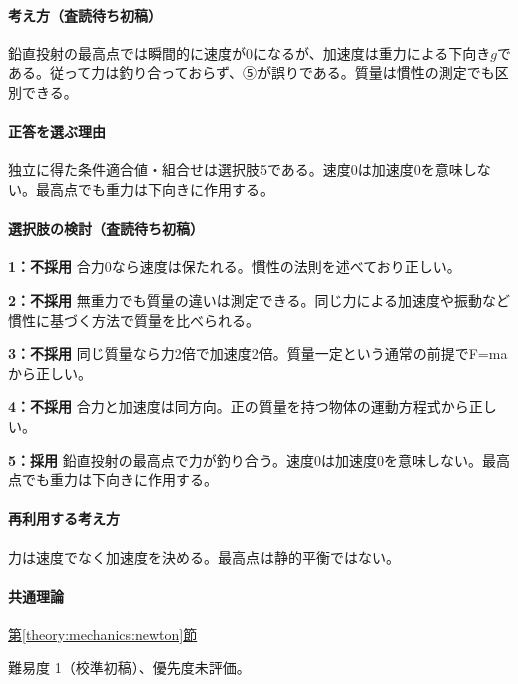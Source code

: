\paragraph{考え方（査読待ち初稿）} 鉛直投射の最高点では瞬間的に速度が0になるが、加速度は重力による下向き\(g\)である。従って力は釣り合っておらず、⑤が誤りである。質量は慣性の測定でも区別できる。

\paragraph{正答を選ぶ理由} 独立に得た条件適合値・組合せは選択肢5である。速度0は加速度0を意味しない。最高点でも重力は下向きに作用する。

\paragraph{選択肢の検討（査読待ち初稿）}\mbox{}\par

\noindent\textbf{1：不採用} 合力0なら速度は保たれる。慣性の法則を述べており正しい。\par

\noindent\textbf{2：不採用} 無重力でも質量の違いは測定できる。同じ力による加速度や振動など慣性に基づく方法で質量を比べられる。\par

\noindent\textbf{3：不採用} 同じ質量なら力2倍で加速度2倍。質量一定という通常の前提でF=\allowbreak{}maから正しい。\par

\noindent\textbf{4：不採用} 合力と加速度は同方向。正の質量を持つ物体の運動方程式から正しい。\par

\noindent\textbf{5：採用} 鉛直投射の最高点で力が釣り合う。速度0は加速度0を意味しない。最高点でも重力は下向きに作用する。\par

\paragraph{再利用する考え方} 力は速度でなく加速度を決める。最高点は静的平衡ではない。

\paragraph{共通理論} \hyperref[theory:mechanics:newton]{第\ref*{theory:mechanics:newton}節}

\par 難易度 1（校準初稿）、優先度未評価。

